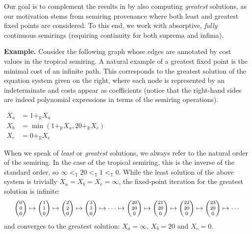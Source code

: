 \documentclass[english,runningheads,a4paper,envcountsame]{llncs}
\newcommand{\IntroParagraph}[1]{\bigskip\noindent\textbf{#1.}}
\newcommand{\Trop}{\mathbb{T}}
\newcommand{\RR}{\mathbb{R}}
\newcommand{\Rplus}{+_\RR}
\newcommand{\vvv}[3]{{\scriptsize\begin{pmatrix}#1 \\ #2 \\ #3\end{pmatrix}}}
\begin{document}
Our goal is to complement the results in \cite{Kleene,Newton} by also computing \emph{greatest} solutions, as our motivation stems from semiring provenance where both least and greatest fixed points are considered.
To this end, we work with absorptive, \emph{fully} continuous semirings (requiring continuity for both suprema and infima).


\IntroParagraph{Example}
Consider the following graph whose edges are annotated by cost values in the tropical semiring.
A natural example of a greatest fixed point is the minimal cost of an infinite path.
This corresponds to the greatest solution of the equation system given on the right, where each node is represented by an indeterminate and costs appear as coefficients (notice that the right-hand sides are indeed polynomial expressions in terms of the semiring operations).

\begin{center}
\hspace{1cm}
$\begin{aligned}
X_a &= 1 \Rplus X_a \\
X_b &= \min(1 \Rplus X_a, 20 \Rplus X_c) \\
X_c &= 0 \Rplus X_c
\end{aligned}$
\end{center}

When we speak of \emph{least} or \emph{greatest} solutions, we always refer to the natural order of the semiring.
In the case of the tropical semiring, this is the inverse of the standard order, so $\infty <_\Trop 20 <_\Trop 1 <_\Trop 0$.
While the least solution of the above system is trivially $X_a = X_b = X_c = \infty$,
the fixed-point iteration for the greatest solution is infinite:
\[
    \vvv 0 0 0 \mapsto \vvv 1 1 0 \mapsto \vvv 2 2 0 \mapsto \vvv 3 3 0 \mapsto \cdots \mapsto
    \vvv {20} {20} 0 \mapsto \vvv {21} {20} 0  \mapsto \vvv {22} {20} 0 \mapsto \vvv {23} {20} 0
    \mapsto \cdots
\]
and converges to the greatest solution: $X_a = \infty$, $X_b = 20$ and $X_c = 0$.
\end{document}
